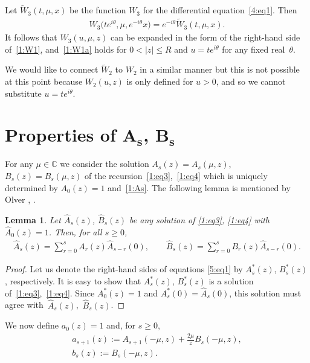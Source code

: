 \documentclass[pdftex]{sigma}
\newcommand{\C}{\mathbb{C}}
\numberwithin{equation}{section}
\newtheorem{Lemma}[Theorem]{Lemma}
{ \theoremstyle{definition}
\newtheorem{Remarks}[Theorem]{Remarks} }
\begin{document}
Let $\tilde W_3(t,\mu,x)$ be the function $W_3$ for the dif\/ferential equation~\eqref{4:eq1}.
Then
\begin{gather*}
W_3\big(te^{i\theta},\mu,e^{-i\theta}x\big)=e^{-i\theta} \tilde W_3(t,\mu,x).
\end{gather*}
It follows that $W_3(u,\mu,z)$ can be expanded in the form of the right-hand side of~\eqref{1:W1}, and~\eqref{1:W1a} holds for $0<|z|\le R$
and $u=te^{i\theta}$ for any f\/ixed real~$\theta$.

We would like to connect $\tilde W_2$ to $W_2$ in a similar manner but this is not possible at this point because $W_2(u,z)$ is only def\/ined for
$u>0$, and so we cannot substitute $u=te^{i\theta}$.

\section[Properties of $A_s$, $B_s$]{Properties of $\boldsymbol{A_s}$, $\boldsymbol{B_s}$}\label{AB}

For any $\mu\in\C$ we consider the solution $A_s(z)=A_s(\mu,z)$, $B_s(z)= B_s(\mu,z)$ of the recur\-sion~\eqref{1:eq3},~\eqref{1:eq4}
which is uniquely determined by $A_0(z)=1$ and~\eqref{1:As}.
The following lemma is mentioned by
Olver \cite[p.~327]{O1}, \cite[p.~81, line~6]{O}.

\begin{Lemma}\label{5:l1}
Let $\hat A_s(z)$, $\hat B_s(z)$ be any solution of \eqref{1:eq3}, \eqref{1:eq4} with $\hat A_0(z)=1$. Then, for all $s\ge 0$,
\begin{gather}\label{5:eq1}
\hat A_s(z)=\sum_{r=0}^s A_r(z)\hat A_{s-r}(0),\qquad \hat B_s(z)=\sum_{r=0}^s B_r(z)\hat A_{s-r}(0) .
\end{gather}
\end{Lemma}
\begin{proof}
Let us denote the right-hand sides of equations \eqref{5:eq1} by $A_s^\ast(z)$, $B_s^\ast(z)$, respectively.
It is easy to show that $A_s^\ast(z)$, $B_s^\ast(z)$ is a solution of~\eqref{1:eq3},~\eqref{1:eq4}. Since $A_0^\ast(z)=1$ and $A_s^\ast(0)=\hat A_s(0)$, this solution must
agree with~$\hat A_s(z)$,~$\hat B_s(z)$.
\end{proof}

We now def\/ine $a_0(z)=1$ and, for $s\ge 0$,
\begin{gather}
 a_{s+1}(z) := A_{s+1}(-\mu,z)+\frac{2\mu}{z} B_s(-\mu,z),\label{5:a}\\
 b_s(z) := B_s(-\mu,z) .\label{5:b}
\end{gather}
\end{document}
